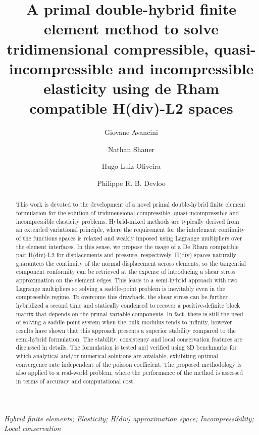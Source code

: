 \documentclass[english,11pt,3p,number,sort&compress]{elsarticle}
\begin{document}
\begin{frontmatter}{}

\title{A primal double-hybrid finite element method to solve tridimensional compressible, quasi-incompressible and incompressible elasticity using de Rham compatible H(div)-L2 spaces}

\author[uni]{Giovane Avancini}


\author[uni]{Nathan Shauer}


\author[uni]{Hugo Luiz Oliveira}


\author[uni]{Philippe R. B. Devloo}


\address[uni]{Universidade Estadual de Campinas, R. Josiah Willard Gibbs 85 - Cidade Universitaria, Campinas SP, Brazil, CEP 13083-839}

\begin{abstract}
	This work is devoted to the development of a novel primal double-hybrid finite element formulation for the solution of tridimensional compressible, quasi-incompressible and incompressible elasticity problems. Hybrid-mixed methods are typically derived from an extended variational principle, where the requirement for the interlement continuity of the functions spaces is relaxed and weakly imposed using Lagrange multipliers over the element interfaces. In this sense, we propose the usage of a De Rham compatible pair H(div)-L2 for displacements and pressure, respectively. H(div) spaces naturally guarantees the continuity of the normal displacement across elements, so the tangential component conformity can be retrieved at the expense of introducing a shear stress approximation on the element edges. This leads to a semi-hybrid approach with two Lagrange multipliers so solving a saddle-point problem is inevitably even in the compreesible regime. To overcome this drawback, the shear stress can be further hybridized a second time and statically condensed to recover a positive-definite block matrix that depends on the primal variable components. In fact, there is still the need of solving a saddle point system when the bulk modulus tends to infinity, however, results have shown that this approach presents a superior stability compared to the semi-hybrid formulation. The stability, consistency and local conservation features are discussed in details. The formulation is tested and verified using 3D benchmarks for which analytical and/or numerical solutions are available, exhibiting optimal convergence rate independent of the poisson coefficient. The proposed methodology is also applied to a real-world problem, where the performance of the method is assessed in terms of accuracy and computational cost.
\end{abstract}
\begin{keyword}
\textit{Hybrid finite elements; Elasticity; H(div) approximation space; Incompressibility; Local conservation}
\end{keyword}


\end{frontmatter}
\end{document}
